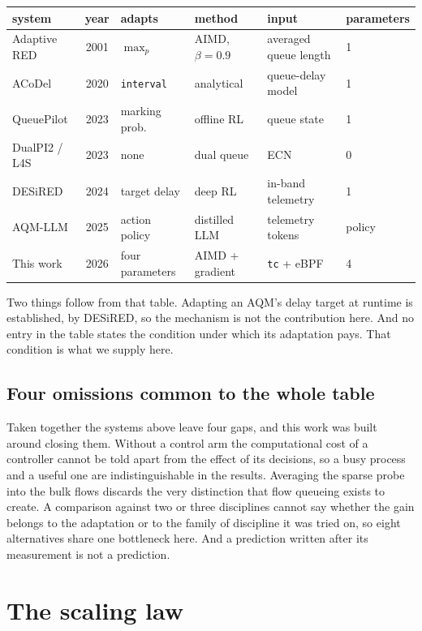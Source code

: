 \documentclass[11pt,a4paper]{article}
\begin{document}
\begin{center}\scriptsize
\begin{tabular}{p{1.9cm}cp{1.7cm}p{2.4cm}p{2.1cm}p{2.4cm}}
\toprule
system & year & adapts & method & input & parameters \\ \midrule
Adaptive RED & 2001 & $\max_p$ & AIMD, $\beta=0.9$ & averaged queue length & 1 \\
ACoDel & 2020 & \texttt{interval} & analytical & queue-delay model & 1 \\
QueuePilot & 2023 & marking prob. & offline RL & queue state & 1 \\
DualPI2 / L4S & 2023 & none & dual queue & ECN & 0 \\
DESiRED & 2024 & target delay & deep RL & in-band telemetry & 1 \\
AQM-LLM & 2025 & action policy & distilled LLM & telemetry tokens & policy \\
This work & 2026 & four parameters & AIMD + gradient & \texttt{tc} + eBPF & 4 \\
\bottomrule
\end{tabular}
\end{center}

Two things follow from that table. Adapting an AQM's delay target at runtime
is established, by DESiRED, so the mechanism is not the contribution here.
And no entry in the table states the condition under which its adaptation
pays. That condition is what we supply here.

\subsection{Four omissions common to the whole table}

Taken together the systems above leave four gaps, and this work was built
around closing them. Without a control arm the computational cost of a
controller cannot be told apart from the effect of its decisions, so a busy
process and a useful one are indistinguishable in the results. Averaging the
sparse probe into the bulk flows discards the very distinction that flow
queueing exists to create. A comparison against two or three disciplines
cannot say whether the gain belongs to the adaptation or to the family of
discipline it was tried on, so eight alternatives share one
bottleneck here. And a prediction written after its measurement is not a
prediction.

\section{The scaling law}\label{s:law}
\end{document}
